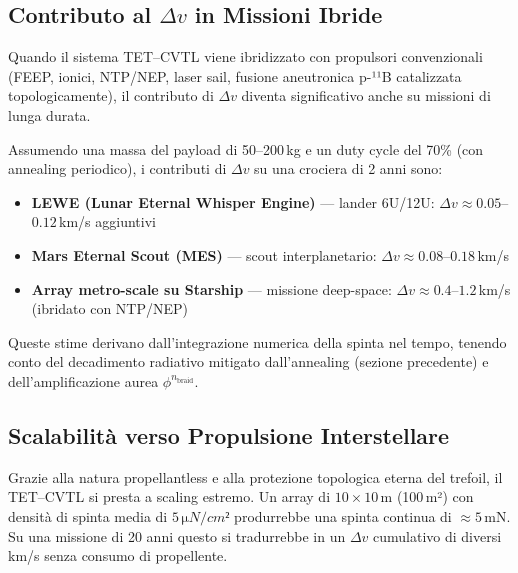 \documentclass[11pt,a4paper]{article}
\theoremstyle{plain}
\theoremstyle{definition}
\begin{document}
\vspace{0.3cm}

\subsection{Contributo al $\Delta v$ in Missioni Ibride}


\vspace{0.2cm}

Quando il sistema TET--CVTL viene ibridizzato con propulsori convenzionali (FEEP, ionici, NTP/NEP, laser sail, fusione aneutronica p-¹¹B catalizzata topologicamente), il contributo di $\Delta v$ diventa significativo anche su missioni di lunga durata.

\vspace{0.3cm}

Assumendo una massa del payload di 50–200\,kg e un duty cycle del 70\% (con annealing periodico), i contributi di $\Delta v$ su una crociera di 2 anni sono:

\begin{itemize}
    \item \textbf{LEWE (Lunar Eternal Whisper Engine)} — lander 6U/12U: $\Delta v \approx 0.05$–$0.12$\,km/s aggiuntivi
    \item \textbf{Mars Eternal Scout (MES)} — scout interplanetario: $\Delta v \approx 0.08$–$0.18$\,km/s
    \item \textbf{Array metro-scale su Starship} — missione deep-space: $\Delta v \approx 0.4$–$1.2$\,km/s (ibridato con NTP/NEP)
\end{itemize}

Queste stime derivano dall’integrazione numerica della spinta nel tempo, tenendo conto del decadimento radiativo mitigato dall’annealing (sezione precedente) e dell’amplificazione aurea $\phi^{n_{\text{braid}}}$.



\vspace{0.3cm}

\subsection{Scalabilità verso Propulsione Interstellare}

\vspace{0.2cm}

Grazie alla natura propellantless e alla protezione topologica eterna del trefoil, il TET--CVTL si presta a scaling estremo. Un array di $10 \times 10$\,m (100\,m²) con densità di spinta media di $5\,\si{\micro N/cm²}$ produrrebbe una spinta continua di $\approx 5$\,mN. Su una missione di 20 anni questo si tradurrebbe in un $\Delta v$ cumulativo di diversi km/s senza consumo di propellente.
\end{document}
